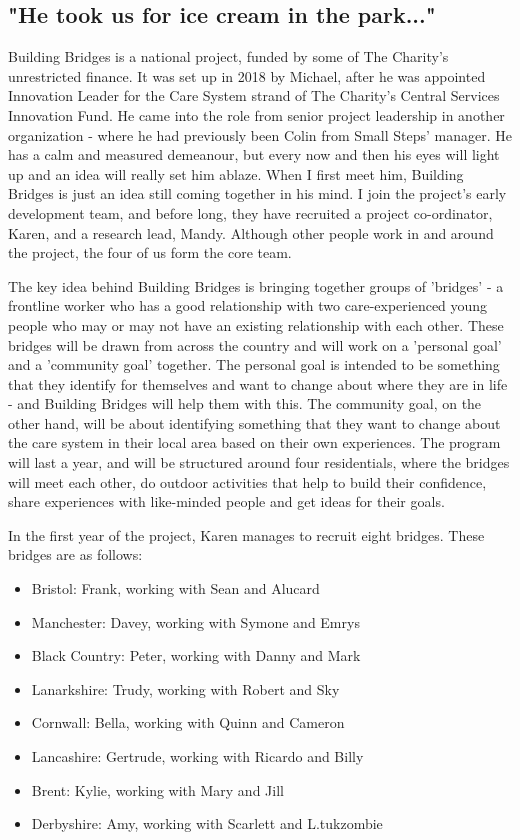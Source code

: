 \subsection{"He took us for ice cream in the park..."}
Building Bridges is a national project, funded by some of The Charity's unrestricted finance. It was set up in 2018 by Michael, after he was appointed Innovation Leader for the Care System strand of The Charity's Central Services Innovation Fund. He came into the role from senior project leadership in another organization - where he had previously been Colin from Small Steps' manager. He has a calm and measured demeanour, but every now and then his eyes will light up and an idea will really set him ablaze. When I first meet him, Building Bridges is just an idea still coming together in his mind. I join the project's early development team, and before long, they have recruited a project co-ordinator, Karen, and a research lead, Mandy. Although other people work in and around the project, the four of us form the core team. 

The key idea behind Building Bridges is bringing together groups of 'bridges' - a frontline worker who has a good relationship with two care-experienced young people who may or may not have an existing relationship with each other. These bridges will be drawn from across the country and will work on a 'personal goal' and  a 'community goal' together. The personal goal is intended to be something that they identify for themselves and want to change about where they are in life - and Building Bridges will help them with this. The community goal, on the other hand, will be about identifying something that they want to change about the care system in their local area based on their own experiences. The program will last a year, and will be structured around four residentials, where the bridges will meet each other, do outdoor activities that help to build their confidence, share experiences with like-minded people and get ideas for their goals. 

In the first year of the project, Karen manages to recruit eight bridges. These bridges are as follows:
\begin{itemize} 
\item Bristol: Frank, working with Sean and Alucard
\item Manchester: Davey, working with Symone and Emrys
\item Black Country: Peter, working with Danny and Mark
\item Lanarkshire: Trudy, working with Robert and Sky
\item Cornwall: Bella, working with Quinn and Cameron
\item Lancashire: Gertrude, working with Ricardo and Billy
\item Brent: Kylie, working with Mary and Jill
\item Derbyshire: Amy, working with Scarlett and L.tukzombie
\end{itemize}

